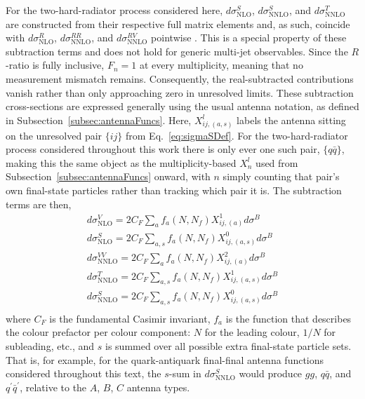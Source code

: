 For the two-hard-radiator process considered here, $d\sigma^S_\text{NLO}$,
$d\sigma^S_\text{NNLO}$, and $d\sigma^T_\text{NNLO}$ 
are constructed from their respective full matrix elements and, as such, 
coincide with $d\sigma^R_\text{NLO}$, $d\sigma^{RR}_\text{NNLO}$, and 
$d\sigma^{RV}_\text{NNLO}$ pointwise \cite{Gehrmann-DeRidder:2005btv}. 
This is a special property of these subtraction 
terms and does not hold for generic multi-jet observables. Since the $R$-ratio is 
fully inclusive, $F_n=1$ at every multiplicity, meaning that no measurement 
mismatch remains. Consequently, the real-subtracted contributions vanish rather 
than only approaching zero in unresolved limits. 
These subtraction cross-sections are expressed generally using the usual antenna
notation, as defined in Subsection~\ref{subsec:antennaFuncs}. Here, $X_{ij,(a,s)}^l$
labels the antenna sitting on the unresolved pair $\{ij\}$ from Eq.~\eqref{eq:sigmaSDef}.
For the two-hard-radiator process considered throughout this work there is only
ever one such pair, $\{q\bar q\}$, making this the same object as the multiplicity-based $X_n^l$
used from Subsection~\ref{subsec:antennaFuncs} onward, with $n$ simply counting
that pair's own final-state particles rather than tracking which pair it is.
The subtraction terms are then,
\begin{equation}\label{eq:subTerms}
    \begin{gathered}
        d\sigma^V_\text{NLO} = 2C_F\sum_{a}f_a(N,N_f)X_{ij,(a)}^1 d\sigma^B\\
        d\sigma^S_\text{NLO} = 2C_F\sum_{a,s}f_a(N,N_f)X_{ij,(a,s)}^0 d\sigma^B\\
        d\sigma^{VV}_\text{NNLO} = 2C_F\sum_{a}f_a(N,N_f)X_{ij,(a)}^2 d\sigma^B\\
        d\sigma^{T}_\text{NNLO} = 2C_F\sum_{a,s}f_a(N,N_f)X_{ij,(a,s)}^1 d\sigma^B\\
        d\sigma^{S}_\text{NNLO} = 2C_F\sum_{a,s}f_a(N,N_f)X_{ij,(a,s)}^0 d\sigma^B\\
    \end{gathered}
\end{equation}
where $C_F$ is the fundamental Casimir invariant, $f_a$ is the function that describes
the colour prefactor per colour component: $N$ for the leading colour, $1/N$ for subleading, etc.,
and $s$ is summed over all possible extra final-state particle sets. That is, for
example, for the quark-antiquark final-final antenna functions considered throughout
this text, the $s$-sum in $d\sigma^S_\text{NNLO}$ would produce $gg$, $q\bar q$,
and $q^\prime\bar q^\prime$, relative to the $A$, $B$, $C$ antenna types.

